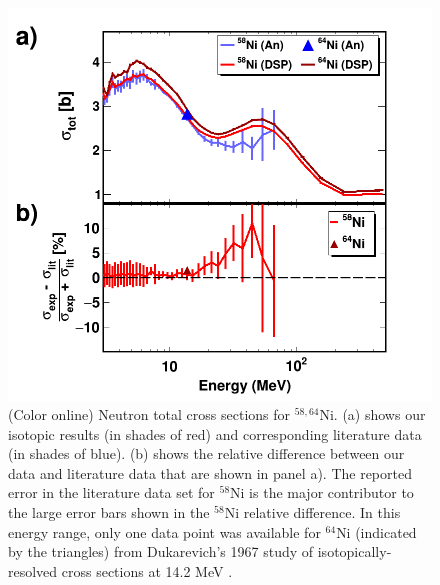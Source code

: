 \documentclass[twocolumn,secnumarabic,amssymb, nobibnotes, aps, prl,
superscriptaddress, nobalancelastpage]{revtex4}
\begin{document}
\begin{figure}
    \includegraphics[scale=0.35]{figures/TwoPanelNi.png}
    \caption{(Color online) Neutron total cross sections for $^{58,64}$Ni.
        (a) shows our isotopic results (in shades of red) and
        corresponding literature data \cite{Perey1993, Dukarevich1967} (in
        shades of blue). (b) shows the relative difference between our data
        and literature data that are shown in panel a). The reported error in
        the literature data set for $^{58}$Ni is the major contributor to the
        large error bars shown in the $^{58}$Ni relative difference. In this
        energy range, only one data point was available for $^{64}$Ni (indicated
        by the triangles) from Dukarevich's 1967 study of isotopically-resolved cross
        sections at 14.2 MeV \cite{Dukarevich1967}.
    }
    \label{TwoPanelNi}
\end{figure}
\end{document}
